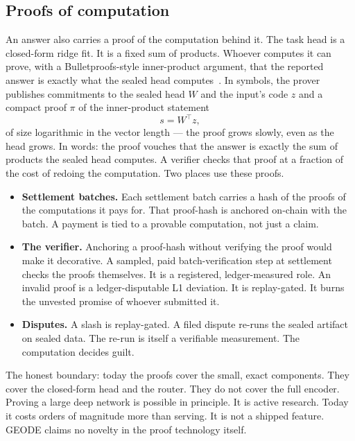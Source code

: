 \documentclass[11pt]{article}
\begin{document}
\subsection{Proofs of computation}\label{sec:proofs}

An answer also carries a proof of the computation behind it. The
task head is a closed-form ridge fit. It is a fixed sum of
products. Whoever computes it can prove, with a Bulletproofs-style
inner-product argument, that the reported answer is exactly what
the sealed head computes~\cite{bunz2018}. In symbols, the prover
publishes commitments to the sealed head $W$ and the input's
code $z$ and a compact proof $\pi$ of the inner-product
statement
\begin{equation}
s = W^\top z,
\end{equation}
of size logarithmic in the vector length --- the proof grows
slowly, even as the head grows. In words: the proof vouches that
the answer is exactly the sum of products the sealed head
computes. A verifier checks that proof at a fraction of the cost
of redoing the computation. Two places use these proofs.
\begin{itemize}
\item \textbf{Settlement batches.} Each settlement batch carries a
hash of the proofs of the computations it pays for. That
proof-hash is anchored on-chain with the batch. A payment is tied
to a provable computation, not just a claim.
\item \textbf{The verifier.} Anchoring a proof-hash without
verifying the proof would make it decorative. A sampled, paid
batch-verification step at settlement checks the proofs
themselves. It is a registered, ledger-measured role. An invalid
proof is a ledger-disputable L1 deviation. It is replay-gated. It
burns the unvested promise of whoever submitted it.
\item \textbf{Disputes.} A slash is replay-gated. A filed dispute
re-runs the sealed artifact on sealed data. The re-run is itself
a verifiable measurement. The computation decides guilt.
\end{itemize}

The honest boundary: today the proofs cover the small, exact
components. They cover the closed-form head and the router. They
do not cover the full encoder. Proving a large deep network is
possible in principle. It is active research. Today it costs
orders of magnitude more than serving. It is not a shipped
feature. GEODE claims no novelty in the proof technology itself.
\end{document}
